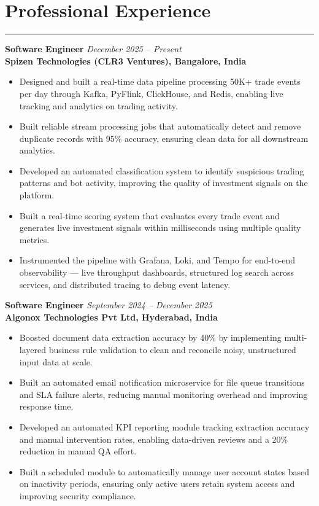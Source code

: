 \documentclass[10pt]{article}
\begin{document}
\section*{Professional Experience}
\vspace{1pt}\hrule\vspace{4pt}

\textbf{Software Engineer} \hfill \textit{December 2025 -- Present} \\
\textbf{Spizen Technologies (CLR3 Ventures), Bangalore, India}
\begin{itemize}
  \item Designed and built a real-time data pipeline processing 50K+ trade events per day through Kafka, PyFlink, ClickHouse, and Redis, enabling live tracking and analytics on trading activity.
  \item Built reliable stream processing jobs that automatically detect and remove duplicate records with 95\% accuracy, ensuring clean data for all downstream analytics.
  \item Developed an automated classification system to identify suspicious trading patterns and bot activity, improving the quality of investment signals on the platform.
  \item Built a real-time scoring system that evaluates every trade event and generates live investment signals within milliseconds using multiple quality metrics.
  \item Instrumented the pipeline with Grafana, Loki, and Tempo for end-to-end observability — live throughput dashboards, structured log search across services, and distributed tracing to debug event latency.
\end{itemize}

\textbf{Software Engineer} \hfill \textit{September 2024 -- December 2025} \\
\textbf{Algonox Technologies Pvt Ltd, Hyderabad, India}
\begin{itemize}
  \item Boosted document data extraction accuracy by 40\% by implementing multi-layered business rule validation to clean and reconcile noisy, unstructured input data at scale.
  \item Built an automated email notification microservice for file queue transitions and SLA failure alerts, reducing manual monitoring overhead and improving response time.
  \item Developed an automated KPI reporting module tracking extraction accuracy and manual intervention rates, enabling data-driven reviews and a 20\% reduction in manual QA effort.
  \item Built a scheduled module to automatically manage user account states based on inactivity periods, ensuring only active users retain system access and improving security compliance.
\end{itemize}
\end{document}
